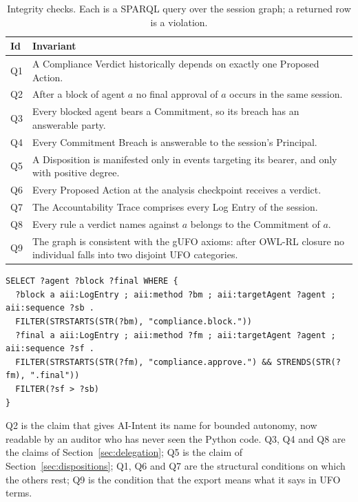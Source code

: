 \documentclass[runningheads]{llncs}
\begin{document}
\begin{table}[tb]
\centering
\caption{Integrity checks. Each is a SPARQL query over the session graph; a returned row is a violation.}
\label{tab:checks}
\begin{tabularx}{\textwidth}{@{}lX@{}}
\toprule
\textbf{Id} & \textbf{Invariant} \\
\midrule
Q1 & A Compliance Verdict historically depends on exactly one Proposed Action. \\
Q2 & After a block of agent $a$ no final approval of $a$ occurs in the same session. \\
Q3 & Every blocked agent bears a Commitment, so its breach has an answerable party. \\
Q4 & Every Commitment Breach is answerable to the session's Principal. \\
Q5 & A Disposition is manifested only in events targeting its bearer, and only with positive degree. \\
Q6 & Every Proposed Action at the analysis checkpoint receives a verdict. \\
Q7 & The Accountability Trace comprises every Log Entry of the session. \\
Q8 & Every rule a verdict names against $a$ belongs to the Commitment of $a$. \\
Q9 & The graph is consistent with the gUFO axioms: after OWL-RL closure no individual falls into two disjoint UFO categories. \\
\bottomrule
\end{tabularx}
\end{table}

\begin{lstlisting}[caption={Q2: no delivery after a block. Entries carry a sequence number in log order.},label={lst:q2}]
SELECT ?agent ?block ?final WHERE {
  ?block a aii:LogEntry ; aii:method ?bm ; aii:targetAgent ?agent ; aii:sequence ?sb .
  FILTER(STRSTARTS(STR(?bm), "compliance.block."))
  ?final a aii:LogEntry ; aii:method ?fm ; aii:targetAgent ?agent ; aii:sequence ?sf .
  FILTER(STRSTARTS(STR(?fm), "compliance.approve.") && STRENDS(STR(?fm), ".final"))
  FILTER(?sf > ?sb)
}
\end{lstlisting}

Q2 is the claim that gives AI-Intent its name for bounded autonomy, now readable by an auditor who has never seen the Python code. Q3, Q4 and Q8 are the claims of Section~\ref{sec:delegation}; Q5 is the claim of Section~\ref{sec:dispositions}; Q1, Q6 and Q7 are the structural conditions on which the others rest; Q9 is the condition that the export means what it says in UFO terms.
\end{document}
